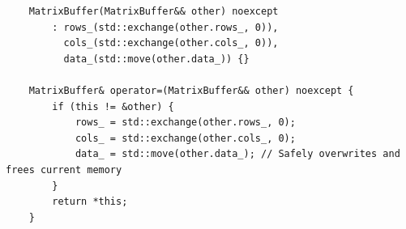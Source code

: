 \begin{verbatim}
    MatrixBuffer(MatrixBuffer&& other) noexcept 
        : rows_(std::exchange(other.rows_, 0)),
          cols_(std::exchange(other.cols_, 0)),
          data_(std::move(other.data_)) {}

    MatrixBuffer& operator=(MatrixBuffer&& other) noexcept {
        if (this != &other) {
            rows_ = std::exchange(other.rows_, 0);
            cols_ = std::exchange(other.cols_, 0);
            data_ = std::move(other.data_); // Safely overwrites and frees current memory
        }
        return *this;
    }
\end{verbatim}
